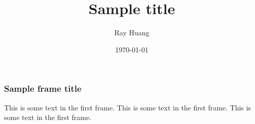 \documentclass{beamer}
\title{Sample title}
\author{Ray Huang}
\institute{Senior Thesis}
\date{\today}
\begin{document}
\frame{\titlepage}

\begin{frame}
\frametitle{Sample frame title}
This is some text in the first frame. This is some text in the first frame. This is some text in the first frame.
\end{frame}
\end{document}
